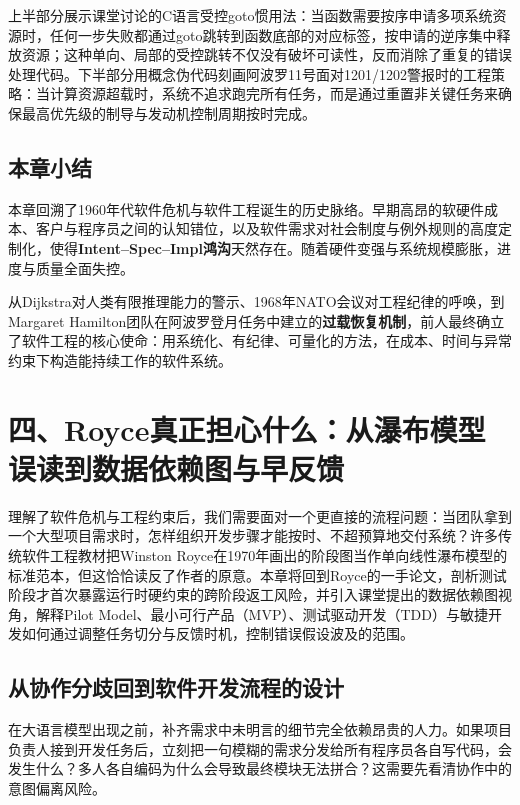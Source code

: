 \documentclass[UTF8,a4paper,11pt,fontset=fandol]{ctexart}
\begin{document}
上半部分展示课堂讨论的C语言受控goto惯用法：当函数需要按序申请多项系统资源时，任何一步失败都通过goto跳转到函数底部的对应标签，按申请的逆序集中释放资源；这种单向、局部的受控跳转不仅没有破坏可读性，反而消除了重复的错误处理代码。下半部分用概念伪代码刻画阿波罗11号面对1201/1202警报时的工程策略：当计算资源超载时，系统不追求跑完所有任务，而是通过重置非关键任务来确保最高优先级的制导与发动机控制周期按时完成。

\subsection{本章小结}

本章回溯了1960年代软件危机与软件工程诞生的历史脉络。早期高昂的软硬件成本、客户与程序员之间的认知错位，以及软件需求对社会制度与例外规则的高度定制化，使得\textbf{Intent–Spec–Impl鸿沟}天然存在。随着硬件变强与系统规模膨胀，进度与质量全面失控。

从Dijkstra对人类有限推理能力的警示、1968年NATO会议对工程纪律的呼唤，到Margaret Hamilton团队在阿波罗登月任务中建立的\textbf{过载恢复机制}，前人最终确立了软件工程的核心使命：用系统化、有纪律、可量化的方法，在成本、时间与异常约束下构造能持续工作的软件系统。

\section{四、Royce真正担心什么：从瀑布模型误读到数据依赖图与早反馈}

理解了软件危机与工程约束后，我们需要面对一个更直接的流程问题：当团队拿到一个大型项目需求时，怎样组织开发步骤才能按时、不超预算地交付系统？许多传统软件工程教材把Winston Royce在1970年画出的阶段图当作单向线性瀑布模型的标准范本，但这恰恰读反了作者的原意。本章将回到Royce的一手论文，剖析测试阶段才首次暴露运行时硬约束的跨阶段返工风险，并引入课堂提出的数据依赖图视角，解释Pilot Model、最小可行产品（MVP）、测试驱动开发（TDD）与敏捷开发如何通过调整任务切分与反馈时机，控制错误假设波及的范围。

\subsection{从协作分歧回到软件开发流程的设计}

在大语言模型出现之前，补齐需求中未明言的细节完全依赖昂贵的人力。如果项目负责人接到开发任务后，立刻把一句模糊的需求分发给所有程序员各自写代码，会发生什么？多人各自编码为什么会导致最终模块无法拼合？这需要先看清协作中的意图偏离风险。
\end{document}
